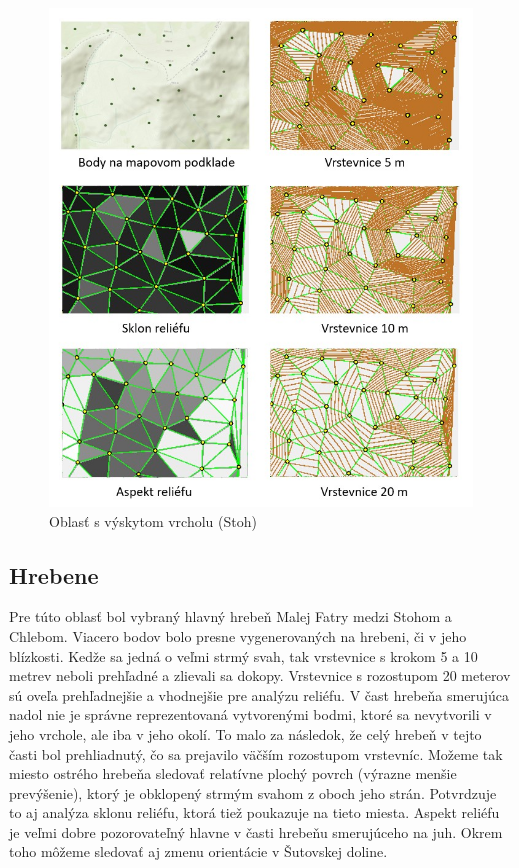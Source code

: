 \documentclass[12pt]{article}
\begin{document}
\begin{figure}[h]
    \centering
    \includegraphics[width=0.56\linewidth]{latex/images/vrchol.jpg}
    \caption{Oblasť s výskytom vrcholu (Stoh)}
    \label{fig:enter-label}
\end{figure}

\subsection*{Hrebene}
Pre túto oblasť bol vybraný hlavný hrebeň Malej Fatry medzi Stohom a Chlebom. Viacero bodov bolo presne vygenerovaných na hrebeni, či v jeho blízkosti. Kedže sa jedná o veľmi strmý svah, tak vrstevnice s krokom 5 a 10 metrev neboli prehľadné a zlievali sa dokopy. Vrstevnice s rozostupom 20 meterov sú oveľa prehľadnejšie a vhodnejšie pre analýzu reliéfu. V čast hrebeňa smerujúca nadol nie je správne reprezentovaná vytvorenými bodmi, ktoré sa nevytvorili v jeho vrchole, ale iba v jeho okolí. To malo za následok, že celý hrebeň v tejto časti bol prehliadnutý, čo sa prejavilo väčším rozostupom vrstevníc. Možeme tak miesto ostrého hrebeňa sledovať relatívne plochý povrch (výrazne menšie prevýšenie), ktorý je obklopený strmým svahom z oboch jeho strán. Potvrdzuje to aj analýza sklonu reliéfu, ktorá tiež poukazuje na tieto miesta. Aspekt reliéfu je veľmi dobre pozorovateľný hlavne v časti hrebeňu smerujúceho na juh. Okrem toho môžeme sledovať aj zmenu orientácie v Šutovskej doline.  
\end{document}
